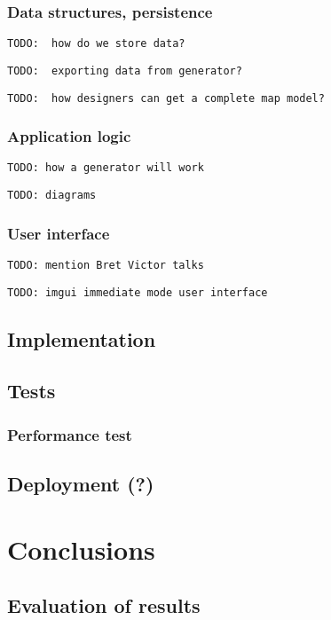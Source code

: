 \documentclass[12pt]{report}
\newcommand{\todo}[1]{}
\renewcommand{\todo}[1]{{\color{red} \par \noindent \footnotesize \texttt{TODO: {#1} }}}
\begin{document}
\subsection{Data structures, persistence}
 
\todo{ how do we store data?}
\todo{ exporting data from generator? }
\todo{ how designers can get a complete map model? } 
 
\subsection{Application logic} 

\todo{how a generator will work}
\todo{diagrams}

\subsection{User interface}

\todo{mention Bret Victor talks}
\todo{imgui immediate mode user interface}

\section{Implementation}




\section{Tests} 

\subsection{Performance test}

\section{Deployment (?)} 

\chapter{Conclusions} \label{rozdzial.podsumowanie}

\section{Evaluation of results} 
\end{document}
